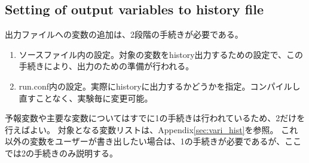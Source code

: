 \subsection{Setting of output variables to history file}
出力ファイルへの変数の追加は、2段階の手続きが必要である。
\begin{enumerate}
\item ソースファイル内の設定。対象の変数をhistory出力するための設定で、この手続きにより、出力のための準備が行われる。
\item run.conf内の設定。実際にhistoryに出力するかどうかを指定。コンパイルし直すことなく、実験毎に変更可能。
\end{enumerate}
予報変数や主要な変数についてはすでに1の手続きは行われているため、2だけを行えばよい。
対象となる変数リストは、Appendix\ref{sec:vari_hist}を参照。
これ以外の変数をユーザーが書き出したい場合は、1の手続きが必要であるが、ここでは2の手続きのみ説明する。


